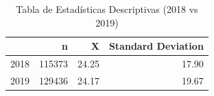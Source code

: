 \begin{table}
\caption{Tabla de Estadísticas Descriptivas (2018 vs 2019)}
\label{tab:stats}
\begin{tabular}{rrrr}
\toprule
 & n & X & Standard Deviation \\
\midrule
2018 & 115373 & 24.25 & 17.90 \\
2019 & 129436 & 24.17 & 19.67 \\
\bottomrule
\end{tabular}
\end{table}
